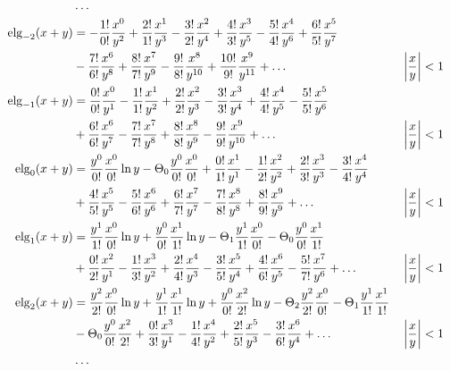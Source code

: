 \begin{equation*} \begin{aligned}
&\ldots \\
%
\elg_{-2}(x + y) &= 
- \frac{1!}{0!} \frac{x^0}{y^2}
+ \frac{2!}{1!} \frac{x^1}{y^3}
- \frac{3!}{2!} \frac{x^2}{y^4}
+ \frac{4!}{3!} \frac{x^3}{y^5}
- \frac{5!}{4!} \frac{x^4}{y^6}
+ \frac{6!}{5!} \frac{x^5}{y^7} \\ &
- \frac{7!}{6!} \frac{x^6}{y^8}
+ \frac{8!}{7!} \frac{x^7}{y^9}
- \frac{9!}{8!} \frac{x^8}{y^{10}}
+ \frac{10!}{9!} \frac{x^9}{y^{11}}
+ \ldots & 
&\left| \frac{x}{y} \right| < 1 \\
%
\elg_{-1}(x + y) &=  
  \frac{0!}{0!} \frac{x^0}{y^1}
- \frac{1!}{1!} \frac{x^1}{y^2}
+ \frac{2!}{2!} \frac{x^2}{y^3}
- \frac{3!}{3!} \frac{x^3}{y^4}
+ \frac{4!}{4!} \frac{x^4}{y^5}
- \frac{5!}{5!} \frac{x^5}{y^6} \\ &
+ \frac{6!}{6!} \frac{x^6}{y^7}
- \frac{7!}{7!} \frac{x^7}{y^8}
+ \frac{8!}{8!} \frac{x^8}{y^9}
- \frac{9!}{9!} \frac{x^9}{y^{10}}
+ \ldots & 
&\left| \frac{x}{y} \right| < 1 \\
%
\elg_0(x + y) &=
  \frac{y^0}{0!} \frac{x^0}{0!} \ln{y}
- \Theta_0 \frac{y^0}{0!} \frac{x^0}{0!}
+ \frac{0!}{1!} \frac{x^1}{y^1} 
- \frac{1!}{2!} \frac{x^2}{y^2}
+ \frac{2!}{3!} \frac{x^3}{y^3}
- \frac{3!}{4!} \frac{x^4}{y^4} \\ &
+ \frac{4!}{5!} \frac{x^5}{y^5}
- \frac{5!}{6!} \frac{x^6}{y^6}
+ \frac{6!}{7!} \frac{x^7}{y^7}
- \frac{7!}{8!} \frac{x^8}{y^8}
+ \frac{8!}{9!} \frac{x^9}{y^9}
+ \ldots & 
&\left| \frac{x}{y} \right| < 1 \\
%
\elg_1(x + y) &=
  \frac{y^1}{1!} \frac{x^0}{0!} \ln{y}
+ \frac{y^0}{0!} \frac{x^1}{1!} \ln{y}
- \Theta_1 \frac{y^1}{1!} \frac{x^0}{0!}
- \Theta_0 \frac{y^0}{0!} \frac{x^1}{1!} \\ &
+ \frac{0!}{2!} \frac{x^2}{y^1}
- \frac{1!}{3!} \frac{x^3}{y^2}
+ \frac{2!}{4!} \frac{x^4}{y^3}
- \frac{3!}{5!} \frac{x^5}{y^4}
+ \frac{4!}{6!} \frac{x^6}{y^5}
- \frac{5!}{7!} \frac{x^7}{y^6}
+ \ldots & 
&\left| \frac{x}{y} \right| < 1 \\
%
\elg_2(x + y) &= 
  \frac{y^2}{2!} \frac{x^0}{0!} \ln{y}
+ \frac{y^1}{1!} \frac{x^1}{1!} \ln{y}
+ \frac{y^0}{0!} \frac{x^2}{2!} \ln{y}
- \Theta_2 \frac{y^2}{2!} \frac{x^0}{0!}
- \Theta_1 \frac{y^1}{1!} \frac{x^1}{1!} \\ &
- \Theta_0 \frac{y^0}{0!} \frac{x^2}{2!}
+ \frac{0!}{3!} \frac{x^3}{y^1}
- \frac{1!}{4!} \frac{x^4}{y^2}
+ \frac{2!}{5!} \frac{x^5}{y^3}
- \frac{3!}{6!} \frac{x^6}{y^4}
+ \ldots & 
&\left| \frac{x}{y} \right| < 1 \\
%
&\ldots \\
\end{aligned} \end{equation*}